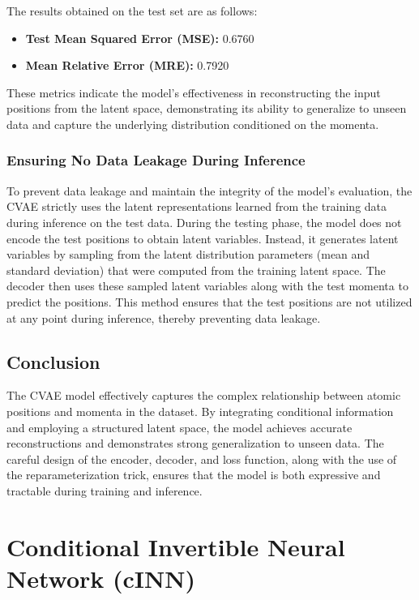 \documentclass[11pt]{paper}
\begin{document}
The results obtained on the test set are as follows:

\begin{itemize}
    \item \textbf{Test Mean Squared Error (MSE):} 0.6760
    \item \textbf{Mean Relative Error (MRE):} 0.7920
\end{itemize}

These metrics indicate the model's effectiveness in reconstructing the input positions from the latent space, demonstrating its ability to generalize to unseen data and capture the underlying distribution conditioned on the momenta.

\subsubsection{Ensuring No Data Leakage During Inference}
\label{subsec:Leakage}
To prevent data leakage and maintain the integrity of the model's evaluation, the CVAE strictly uses the latent representations learned from the training data during inference on the test data. During the testing phase, the model does not encode the test positions to obtain latent variables. Instead, it generates latent variables by sampling from the latent distribution parameters (mean and standard deviation) that were computed from the training latent space. The decoder then uses these sampled latent variables along with the test momenta to predict the positions. This method ensures that the test positions are not utilized at any point during inference, thereby preventing data leakage.


\subsection{Conclusion}

The CVAE model effectively captures the complex relationship between atomic positions and momenta in the dataset. By integrating conditional information and employing a structured latent space, the model achieves accurate reconstructions and demonstrates strong generalization to unseen data. The careful design of the encoder, decoder, and loss function, along with the use of the reparameterization trick, ensures that the model is both expressive and tractable during training and inference.


\section{Conditional Invertible Neural Network (cINN)}
\end{document}
